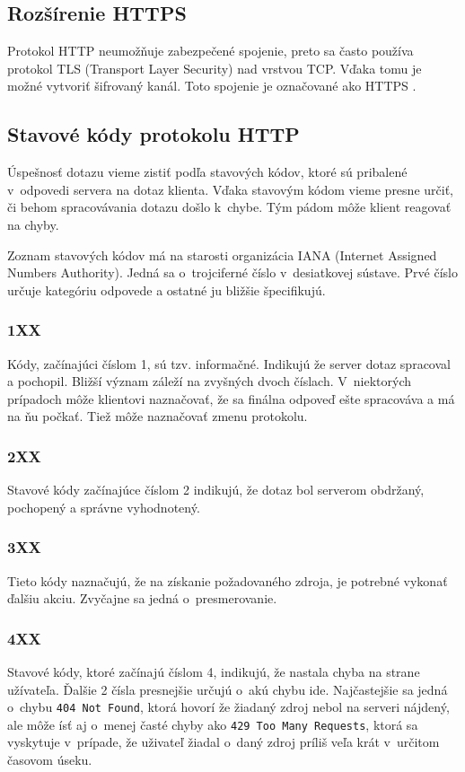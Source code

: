 \documentclass[slovak]{fitthesis}
\begin{document}
\subsection{Rozšírenie HTTPS}
Protokol HTTP neumožňuje zabezpečené spojenie, preto sa často používa protokol TLS (Transport Layer Security) nad vrstvou TCP. Vďaka tomu je možné vytvoriť šifrovaný kanál. Toto spojenie je označované ako HTTPS \cite{httpsRFC}.


\subsection{Stavové kódy protokolu HTTP}
Úspešnosť dotazu vieme zistiť podľa stavových kódov, ktoré sú pribalené v~odpovedi servera na dotaz klienta. Vďaka stavovým kódom vieme presne určiť, či behom spracovávania dotazu došlo k~chybe. Tým pádom môže klient reagovať na chyby.

Zoznam stavových kódov má na starosti organizácia IANA (Internet Assigned Numbers Authority). Jedná sa o~trojciferné číslo v~desiatkovej sústave. Prvé číslo určuje kategóriu odpovede a ostatné ju bližšie špecifikujú.

\subsubsection{1XX}
Kódy, začínajúci číslom 1, sú tzv. informačné. Indikujú že server dotaz spracoval a pochopil. Bližší význam záleží na zvyšných dvoch číslach. V~niektorých prípadoch môže klientovi naznačovať, že sa finálna odpoveď ešte spracováva a má na ňu počkať. Tiež môže naznačovať zmenu protokolu.

\label{2XX}
\subsubsection{2XX}
Stavové kódy začínajúce číslom 2 indikujú, že dotaz bol serverom obdržaný, pochopený a správne vyhodnotený.

\subsubsection{3XX}
Tieto kódy naznačujú, že na získanie požadovaného zdroja, je potrebné vykonať ďalšiu akciu. Zvyčajne sa jedná o~presmerovanie.

\label{4XX}
\subsubsection{4XX}
Stavové kódy, ktoré začínajú číslom 4, indikujú, že nastala chyba na strane užívateľa. Ďalšie 2 čísla presnejšie určujú o~akú chybu ide. Najčastejšie sa jedná o~chybu \texttt{404 Not Found}, ktorá hovorí že žiadaný zdroj nebol na serveri nájdený, ale môže ísť aj o~menej časté chyby ako \texttt{429 Too Many Requests}, ktorá sa vyskytuje v~prípade, že uživateľ žiadal o~daný zdroj príliš veľa krát v~určitom časovom úseku.
\end{document}
